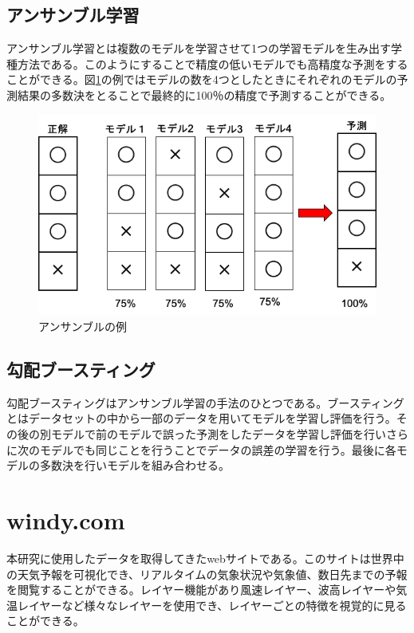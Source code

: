 \subsection{アンサンブル学習}
アンサンブル学習とは複数のモデルを学習させて1つの学習モデルを生み出す学種方法である。このようにすることで精度の低いモデルでも高精度な予測をすることができる。図\ref{ensemble}の例ではモデルの数を4つとしたときにそれぞれのモデルの予測結果の多数決をとることで最終的に100％の精度で予測することができる。
\begin{figure}[H]
 \centering
 \includegraphics[keepaspectratio, scale=0.4]{fig/chapter2/ensemble.png}
 \caption{アンサンブルの例}
 \label{ensemble}
\end{figure}

\subsection{勾配ブースティング}
勾配ブースティングはアンサンブル学習の手法のひとつである。ブースティングとはデータセットの中から一部のデータを用いてモデルを学習し評価を行う。その後の別モデルで前のモデルで誤った予測をしたデータを学習し評価を行いさらに次のモデルでも同じことを行うことでデータの誤差の学習を行う。最後に各モデルの多数決を行いモデルを組み合わせる。

\section{windy.com}
本研究に使用したデータを取得してきたwebサイトである。このサイトは世界中の天気予報を可視化でき、リアルタイムの気象状況や気象値、数日先までの予報を閲覧することができる。レイヤー機能があり風速レイヤー、波高レイヤーや気温レイヤーなど様々なレイヤーを使用でき、レイヤーごとの特徴を視覚的に見ることができる\cite{windy}。

